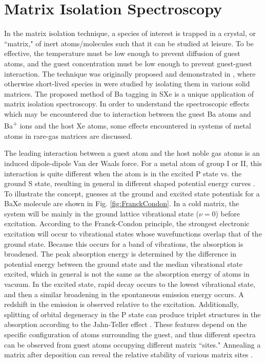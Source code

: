 \section{Matrix Isolation Spectroscopy}
\label{sec:matrix}


In the matrix isolation technique, a species of interest is trapped in a crystal, or ``matrix," of inert atoms/molecules such that it can be studied at leisure.  To be effective, the temperature must be low enough to prevent diffusion of guest atoms, and the guest concentration must be low enough to prevent guest-guest interaction.  The technique was originally proposed and demonstrated in \cite{matrixIso}, where otherwise short-lived species in were studied by isolating them in various solid matrices.  The proposed method of Ba tagging in SXe is a unique application of matrix isolation spectroscopy.  In order to understand the spectroscopic effects which may be encountered due to interaction between the guest Ba atoms and Ba\textsuperscript{+} ions and the host Xe atoms, some effects encountered in systems of metal atoms in rare-gas matrices are discussed.


The leading interaction between a guest atom and the host noble gas atoms is an induced dipole-dipole Van der Waals force.  For a metal atom of group I or II, this interaction is quite different when the atom is in the excited P state vs. the ground S state, resulting in general in different shaped potential energy curves \cite{crepin}.  To illustrate the concept, guesses at the ground and excited state potentials for a BaXe molecule are shown in Fig. \ref{fig:FranckCondon}.  In a cold matrix, the system will be mainly in the ground lattice vibrational state ($\nu =0$) before excitation.  According to the Franck-Condon principle, the strongest electronic excitation will occur to vibrational states whose wavefunctions overlap that of the ground state.  Because this occurs for a band of vibrations, the absorption is broadened.  The peak absorption energy is determined by the difference in potential energy between the ground state and the median vibrational state excited, which in general is not the same as the absorption energy of atoms in vacuum.  In the excited state, rapid decay occurs to the lowest vibrational state, and then a similar broadening in the spontaneous emission energy occurs.  A redshift in the emission is observed relative to the excitation.  Additionally, splitting of orbital degeneracy in the P state can produce triplet structures in the absorption according to the Jahn-Teller effect \cite{jahnteller}.  These features depend on the specific configuration of atoms surrounding the guest, and thus different spectra can be observed from guest atoms occupying different matrix ``sites."  Annealing a matrix after deposition can reveal the relative stability of various matrix sites \cite{crepin}.

